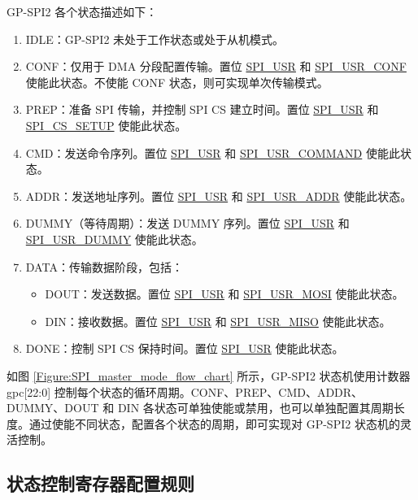 \documentclass[main\_\_CN.tex]{subfiles}
\begin{document}
GP-SPI2 各个状态描述如下：
\begin{enumerate}
    \item IDLE：GP-SPI2 未处于工作状态或处于从机模式。
    \item CONF：仅用于 DMA 分段配置传输。置位 \hyperref[fielddesc:SPIUSR]{SPI\_USR} 和 \hyperref[fielddesc:SPIUSRCONF]{SPI\_USR\_CONF} 使能此状态。不使能 CONF 状态，则可实现单次传输模式。
    \item PREP：准备 SPI 传输，并控制 SPI CS 建立时间。置位 \hyperref[fielddesc:SPIUSR]{SPI\_USR} 和 \hyperref[fielddesc:SPICSSETUP]{SPI\_CS\_SETUP} 使能此状态。
    \item \label{phase:cmd} CMD：发送命令序列。置位 \hyperref[fielddesc:SPIUSR]{SPI\_USR} 和 \hyperref[fielddesc:SPIUSRCOMMAND]{SPI\_USR\_COMMAND} 使能此状态。
    \item \label{phase:addr} ADDR：发送地址序列。置位 \hyperref[fielddesc:SPIUSR]{SPI\_USR} 和 \hyperref[fielddesc:SPIUSRADDR]{SPI\_USR\_ADDR} 使能此状态。
    \item DUMMY（等待周期）：发送 DUMMY 序列。置位 \hyperref[fielddesc:SPIUSR]{SPI\_USR} 和 \hyperref[fielddesc:SPIUSRDUMMY]{SPI\_USR\_DUMMY} 使能此状态。
    \item DATA：传输数据阶段，包括：\label{phase:data}
    \begin{itemize}
        \item DOUT：发送数据。置位 \hyperref[fielddesc:SPIUSR]{SPI\_USR} 和 \hyperref[fielddesc:SPIUSRMOSI]{SPI\_USR\_MOSI} 使能此状态。
        \item DIN：接收数据。置位 \hyperref[fielddesc:SPIUSR]{SPI\_USR} 和 \hyperref[fielddesc:SPIUSRMISO]{SPI\_USR\_MISO} 使能此状态。
    \end{itemize}
    \item DONE：控制 SPI CS 保持时间。置位 \hyperref[fielddesc:SPIUSR]{SPI\_USR} 使能此状态。
\end{enumerate}

如图 \ref{Figure:SPI_master_mode_flow_chart} 所示，GP-SPI2 状态机使用计数器 gpc[22:0] 控制每个状态的循环周期。CONF、PREP、CMD、ADDR、DUMMY、DOUT 和 DIN 各状态可单独使能或禁用，也可以单独配置其周期长度。通过使能不同状态，配置各个状态的周期，即可实现对 GP-SPI2 状态机的灵活控制。

\subsection{状态控制寄存器配置规则}\label{GP-SPI2 state and register configuration}
\end{document}
